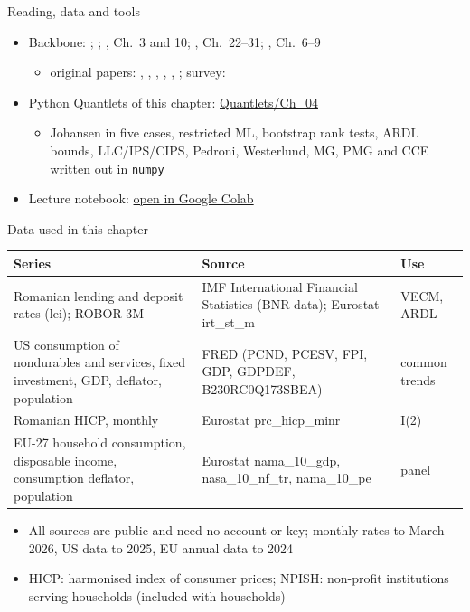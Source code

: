 \begin{frame}{Reading, data and tools}
\itemsize{\small}
\begin{itemize}
    \item Backbone: ; ; , Ch.~3 and 10; , Ch.~22--31; , Ch.~6--9
    \begin{itemize}
        \item original papers: , , , , , ; survey: 
    \end{itemize}
    \item Python Quantlets of this chapter: \href{https://github.com/danpele/Advanced-Time-Series/tree/main/Quantlets/Ch_04}{Quantlets/Ch\_04}
    \begin{itemize}
        \item Johansen in five cases, restricted ML, bootstrap rank tests, ARDL bounds, LLC/IPS/CIPS, Pedroni, Westerlund, MG, PMG and CCE written out in \texttt{numpy}
    \end{itemize}
    \item Lecture notebook: \href{\colaburl{notebooks/EN/chapter4_lecture_notebook.ipynb}}{open in Google Colab}
\end{itemize}
\end{frame}

\begin{frame}{Data used in this chapter}
\itemsize{\footnotesize}
\begin{center}
\scriptsize
\begin{tabular}{>{\raggedright\arraybackslash}p{4.9cm}>{\raggedright\arraybackslash}p{4.6cm}>{\raggedright\arraybackslash}p{2.4cm}}
\toprule
\textbf{Series} & \textbf{Source} & \textbf{Use} \\
\midrule
Romanian lending and deposit rates (lei); ROBOR 3M & IMF International Financial Statistics (BNR data); Eurostat irt\_st\_m & VECM, ARDL \\
US consumption of nondurables and services, fixed investment, GDP, deflator, population & FRED (PCND, PCESV, FPI, GDP, GDPDEF, B230RC0Q173SBEA) & common trends \\
Romanian HICP, monthly & Eurostat prc\_hicp\_minr & I(2) \\
EU-27 household consumption, disposable income, consumption deflator, population & Eurostat nama\_10\_gdp, nasa\_10\_nf\_tr, nama\_10\_pe & panel \\
\bottomrule
\end{tabular}
\end{center}
\begin{itemize}
    \item All sources are public and need no account or key; monthly rates to March 2026, US data to 2025, EU annual data to 2024
    \item HICP: harmonised index of consumer prices; NPISH: non-profit institutions serving households (included with households)
\end{itemize}
\end{frame}

